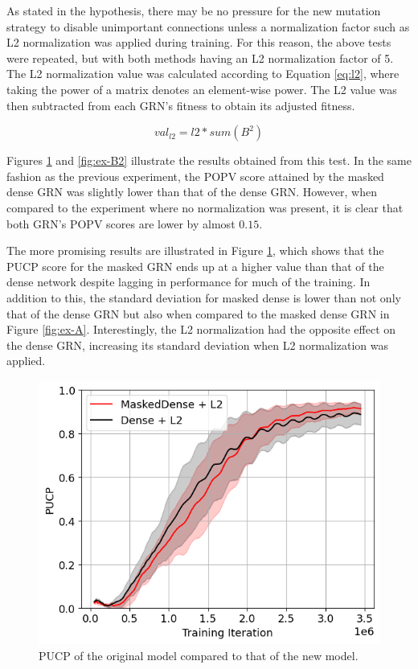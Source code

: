 \documentclass[twocolumn,a4paper,11pt]{article}
\begin{document}
    As stated in the hypothesis, there may be no pressure for the new mutation strategy to disable unimportant connections unless a normalization factor such as L2 normalization was applied during training. For this reason, the above tests were repeated, but with both methods having an L2 normalization factor of 5. The L2 normalization value was calculated according to Equation \ref{eq:l2}, where taking the power of a matrix denotes an element-wise power. The L2 value was then subtracted from each GRN's fitness to obtain its adjusted fitness.

    \begin{equation}
        val_{l2} = l2*sum(B^2)
        \label{eq:l2}
    \end{equation}

    Figures \ref{fig:ex-B} and \ref{fig:ex-B2} illustrate the results obtained from this test. In the same fashion as the previous experiment, the POPV score attained by the masked dense GRN was slightly lower than that of the dense GRN. However, when compared to the experiment where no normalization was present, it is clear that both GRN's POPV scores are lower by almost $0.15$.
    
    The more promising results are illustrated in Figure \ref{fig:ex-B}, which shows that the PUCP score for the masked GRN ends up at a higher value than that of the dense network despite lagging in performance for much of the training. In addition to this, the standard deviation for masked dense is lower than not only that of the dense GRN but also when compared to the masked dense GRN in Figure \ref{fig:ex-A}. Interestingly, the L2 normalization had the opposite effect on the dense GRN, increasing its standard deviation when L2 normalization was applied.

    \begin{figure}[h]
        \centering
        \includegraphics[width=0.9\linewidth]{ex-img/final-l2-pucp.png}
        \caption{PUCP of the original model compared to that of the new model.} \label{fig:ex-B}
    \end{figure}
\end{document}
